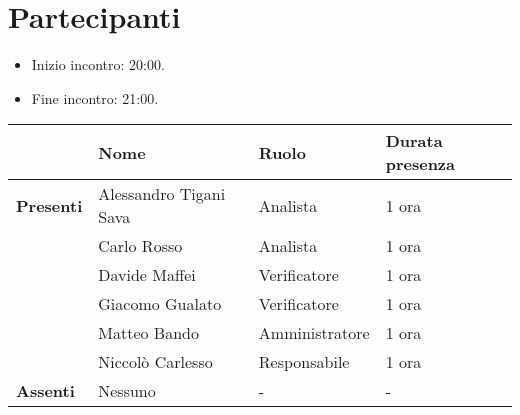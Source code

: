 \section*{Partecipanti}

\begin{itemize}
	\item Inizio incontro: 20:00.
	\item Fine incontro: 21:00.
\end{itemize}


\begin{center}
	\begin{tabular}{llll}
		                  & \textbf{Nome}          & \textbf{Ruolo} & \textbf{Durata presenza} \\
		\hline
		\textbf{Presenti} & Alessandro Tigani Sava & Analista 		& 1 ora	\\
		                  & Carlo Rosso            & Analista 		& 1 ora	\\
		                  & Davide Maffei          & Verificatore	& 1 ora	\\
		                  & Giacomo Gualato        & Verificatore	& 1 ora	\\
		                  & Matteo Bando           & Amministratore	& 1 ora	\\
		                  & Niccolò Carlesso       & Responsabile	& 1 ora	\\
		\hline
		\textbf{Assenti}  & Nessuno                & -              & -		\\
	\end{tabular}
\end{center}
